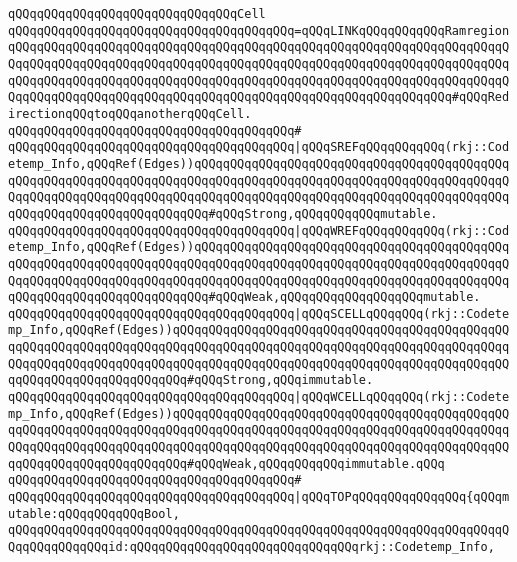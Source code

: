 \newline
\verb|qQQqqQQqqQQqqQQqqQQqqQQqqQQqqQQqCell|\newline
\verb|qQQqqQQqqQQqqQQqqQQqqQQqqQQqqQQqqQQqqQQq=qQQqLINKqQQqqQQqqQQqRamregionqQQqqQQqqQQqqQQqqQQqqQQqqQQqqQQqqQQqqQQqqQQqqQQqqQQqqQQqqQQqqQQqqQQqqQQqqQQqqQQqqQQqqQQqqQQqqQQqqQQqqQQqqQQqqQQqqQQqqQQqqQQqqQQqqQQqqQQqqQQqqQQqqQQqqQQqqQQqqQQqqQQqqQQqqQQqqQQqqQQqqQQqqQQqqQQqqQQqqQQqqQQqqQQqqQQqqQQqqQQqqQQqqQQqqQQqqQQqqQQqqQQqqQQqqQQqqQQqqQQqqQQqqQQqqQQq#qQQqRedirectionqQQqtoqQQqanotherqQQqCell.|\newline
\verb|qQQqqQQqqQQqqQQqqQQqqQQqqQQqqQQqqQQqqQQq#|\newline
\verb|qQQqqQQqqQQqqQQqqQQqqQQqqQQqqQQqqQQqqQQq|\verb#|qQQqSREFqQQqqQQqqQQq(rkj::Codetemp_Info,qQQqRef(Edges))qQQqqQQqqQQqqQQqqQQqqQQqqQQqqQQqqQQqqQQqqQQqqQQqqQQqqQQqqQQqqQQqqQQqqQQqqQQqqQQqqQQqqQQqqQQqqQQqqQQqqQQqqQQqqQQqqQQqqQQqqQQqqQQqqQQqqQQqqQQqqQQqqQQqqQQqqQQqqQQqqQQqqQQqqQQqqQQqqQQqqQQqqQQqqQQqqQQqqQQqqQQqqQQqqQQq#\verb|#qQQqStrong,qQQqqQQqqQQqmutable.|\newline
\verb|qQQqqQQqqQQqqQQqqQQqqQQqqQQqqQQqqQQqqQQq|\verb#|qQQqWREFqQQqqQQqqQQq(rkj::Codetemp_Info,qQQqRef(Edges))qQQqqQQqqQQqqQQqqQQqqQQqqQQqqQQqqQQqqQQqqQQqqQQqqQQqqQQqqQQqqQQqqQQqqQQqqQQqqQQqqQQqqQQqqQQqqQQqqQQqqQQqqQQqqQQqqQQqqQQqqQQqqQQqqQQqqQQqqQQqqQQqqQQqqQQqqQQqqQQqqQQqqQQqqQQqqQQqqQQqqQQqqQQqqQQqqQQqqQQqqQQqqQQqqQQq#\verb|#qQQqWeak,qQQqqQQqqQQqqQQqqQQqmutable.|\newline
\verb|qQQqqQQqqQQqqQQqqQQqqQQqqQQqqQQqqQQqqQQq|\verb#|qQQqSCELLqQQqqQQq(rkj::Codetemp_Info,qQQqRef(Edges))qQQqqQQqqQQqqQQqqQQqqQQqqQQqqQQqqQQqqQQqqQQqqQQqqQQqqQQqqQQqqQQqqQQqqQQqqQQqqQQqqQQqqQQqqQQqqQQqqQQqqQQqqQQqqQQqqQQqqQQqqQQqqQQqqQQqqQQqqQQqqQQqqQQqqQQqqQQqqQQqqQQqqQQqqQQqqQQqqQQqqQQqqQQqqQQqqQQqqQQqqQQqqQQqqQQq#\verb|#qQQqStrong,qQQqimmutable.|\newline
\verb|qQQqqQQqqQQqqQQqqQQqqQQqqQQqqQQqqQQqqQQq|\verb#|qQQqWCELLqQQqqQQq(rkj::Codetemp_Info,qQQqRef(Edges))qQQqqQQqqQQqqQQqqQQqqQQqqQQqqQQqqQQqqQQqqQQqqQQqqQQqqQQqqQQqqQQqqQQqqQQqqQQqqQQqqQQqqQQqqQQqqQQqqQQqqQQqqQQqqQQqqQQqqQQqqQQqqQQqqQQqqQQqqQQqqQQqqQQqqQQqqQQqqQQqqQQqqQQqqQQqqQQqqQQqqQQqqQQqqQQqqQQqqQQqqQQqqQQqqQQq#\verb|#qQQqWeak,qQQqqQQqqQQqimmutable.qQQq|\newline
\verb|qQQqqQQqqQQqqQQqqQQqqQQqqQQqqQQqqQQqqQQq#|\newline
\verb|qQQqqQQqqQQqqQQqqQQqqQQqqQQqqQQqqQQqqQQq|\verb#|qQQqTOPqQQqqQQqqQQqqQQq{qQQqmutable:qQQqqQQqqQQqBool,#\newline
\verb|qQQqqQQqqQQqqQQqqQQqqQQqqQQqqQQqqQQqqQQqqQQqqQQqqQQqqQQqqQQqqQQqqQQqqQQqqQQqqQQqqQQqid:qQQqqQQqqQQqqQQqqQQqqQQqqQQqqQQqrkj::Codetemp_Info,|\newline

